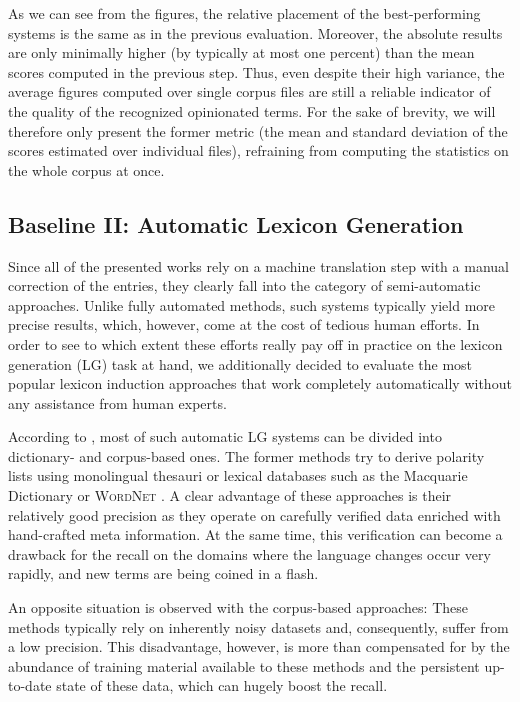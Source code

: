 As we can see from the figures, the relative placement of the
best-performing systems is the same as in the previous evaluation.
Moreover, the absolute results are only minimally higher (by typically
at most one percent) than the mean scores computed in the previous
step.  Thus, even despite their high variance, the average figures
computed over single corpus files are still a reliable indicator of
the quality of the recognized opinionated terms.  For the sake of
brevity, we will therefore only present the former metric (the mean
and standard deviation of the scores estimated over individual files),
refraining from computing the statistics on the whole corpus at once.

\subsection{Baseline II: Automatic Lexicon Generation}

Since all of the presented works rely on a machine translation step
with a manual correction of the entries, they clearly fall into the
category of semi-automatic approaches.  Unlike fully automated
methods, such systems typically yield more precise results, which,
however, come at the cost of tedious human efforts.  In order to see
to which extent these efforts really pay off in practice on the
lexicon generation (LG) task at hand, we additionally decided to
evaluate the most popular lexicon induction approaches that work
completely automatically without any assistance from human experts.

According to \citet[p. 79]{Liu:12}, most of such automatic LG systems
can be divided into dictionary- and corpus-based ones.  The former
methods try to derive polarity lists using monolingual thesauri or
lexical databases such as the Macquarie Dictionary \cite{Bernard:86}
or \textsc{WordNet} \cite{Miller:95}.  A clear advantage of these
approaches is their relatively good precision as they operate on
carefully verified data enriched with hand-crafted meta information.
At the same time, this verification can become a drawback for the
recall on the domains where the language changes occur very rapidly,
and new terms are being coined in a flash.

An opposite situation is observed with the corpus-based approaches:
These methods typically rely on inherently noisy datasets and,
consequently, suffer from a low precision.  This disadvantage,
however, is more than compensated for by the abundance of training
material available to these methods and the persistent up-to-date
state of these data, which can hugely boost the recall.

